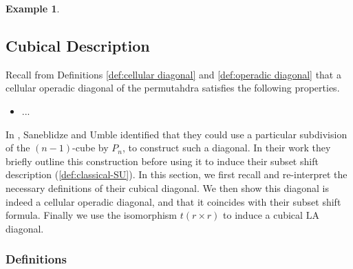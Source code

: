 \documentclass{amsart}
\theoremstyle{definition}
\newtheorem{example}[theorem]{Example}
\newcommand{\LA}{\mathrm{LA}}
\begin{document}
\begin{example}
\begin{center}
{
}
\end{center}


\end{example}

\subsection{Cubical Description}\label{sec:Cubical}

Recall from Definitions \ref{def:cellular diagonal} and \ref{def:operadic diagonal} that a cellular operadic diagonal of the permutahdra satisfies the following properties.
\begin{itemize}
    \item ...
\end{itemize}
In \cite{SaneblidzeUmble04}, Saneblidze and Umble identified that they could use a particular subdivision of the $(n-1)$-cube by $P_{n}$, to construct such a diagonal.
In their work they briefly outline this construction before using it to induce their subset shift description (\cref{def:classical-SU}).
In this section, we first recall and re-interpret the necessary definitions of their cubical diagonal.
We then show this diagonal is indeed a cellular operadic diagonal, and that it coincides with their subset shift formula.
Finally we use the isomorphism $t(r\times r)$ to induce a cubical $\LA$ diagonal.

\subsubsection{Definitions}
\end{document}
